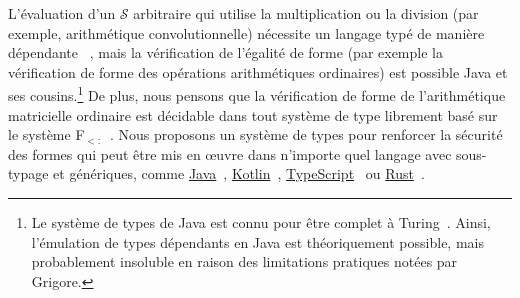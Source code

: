 L'évaluation d'un $\mathcal{S}$ arbitraire qui utilise la multiplication ou la division (par exemple, arithmétique convolutionnelle) nécessite un langage typé de manière dépendante ~\citep{xi1998eliminating, pineyro2019structure}, mais la vérification de l'égalité de forme (par exemple la vérification de forme des opérations arithmétiques ordinaires) est possible Java et ses cousins.\hspace{-.08em}\footnote{Le système de types de Java est connu pour être complet à Turing~\citep{grigore2017java}. Ainsi, l'émulation de types dépendants en Java est théoriquement possible, mais probablement insoluble en raison des limitations pratiques notées par Grigore.} De plus, nous pensons que la vérification de forme de l'arithmétique matricielle ordinaire est décidable dans tout système de type librement basé sur le système F${}_{<:}$~\citep{cardelli1991extension}. Nous proposons un système de types pour renforcer la sécurité des formes qui peut être mis en œuvre dans n'importe quel langage avec sous-typage et génériques, comme \href{https://docs.oracle.com/javase/tutorial/java/generics/index.html}{Java}~\citep{naftalin2007java}, \href{https://kotlinlang.org/docs/reference/generics.html}{Kotlin}~\citep{tate2013mixed}, \href{https://www.typescriptlang.org/docs/handbook/advanced-types.html}{TypeScript}~\citep{bierman2014understanding} ou \href{https://doc.rust-lang.org/1.7.0/book/generics.html}{Rust}~\citep{crozet2019nalgebra}.

